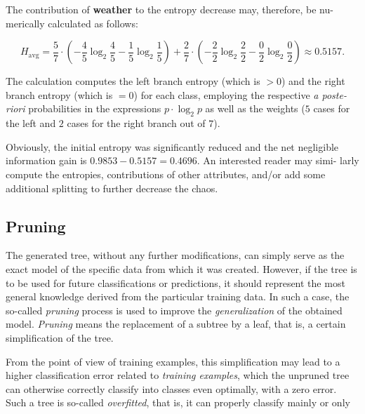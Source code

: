 \documentclass[11pt,openany,executivepaper]{book}
\begin{document}
The contribution of \textbf{weather} to the entropy decrease may, therefore, be nu-
merically calculated as follows:

\begin{equation*}
    H_{\text{avg}} = \frac{5}{7} \cdot \left( - \frac{4}{5}\log_2\frac{4}{5} - \frac{1}{5}\log_2\frac{1}{5} \right) + \frac{2}{7} \cdot \left( - \frac{2}{2}\log_2\frac{2}{2} - \frac{0}{2}\log_2\frac{0}{2} \right) \approx 0.5157.
\end{equation*}

The calculation computes the left branch entropy (which is $> 0$) and the right 
branch entropy (which is $= 0$) for each class, employing the respective \textit{a poste-
riori} probabilities in the expressions $p\cdot \log_2 p$ as well as the weights ($5$ cases for 
the left and $2$ cases for the right branch out of $7$).

Obviously, the initial entropy was significantly reduced and the net negligible 
information gain is $0.9853 - 0.5157 = 0.4696$. An interested reader may simi-
larly compute the entropies, contributions of other attributes, and/or add some 
additional splitting to further decrease the chaos.

\subsection{Pruning}

The generated tree, without any further modifications, can simply serve as the 
exact model of the specific data from which it was created. However, if the tree 
is to be used for future classifications or predictions, it should represent the most 
general knowledge derived from the particular training data. In such a case, the 
so-called \textit{pruning} process is used to improve the \textit{generalization} of the obtained 
model. \textit{Pruning} means the replacement of a subtree by a leaf, that is, a certain 
simplification of the tree.

From the point of view of training examples, this simplification may lead 
to a higher classification error related to \textit{training examples}, which the unpruned 
tree can otherwise correctly classify into classes even optimally, with a zero error. 
Such a tree is so-called \textit{overfitted}, that is, it can properly classify mainly or only
\end{document}
